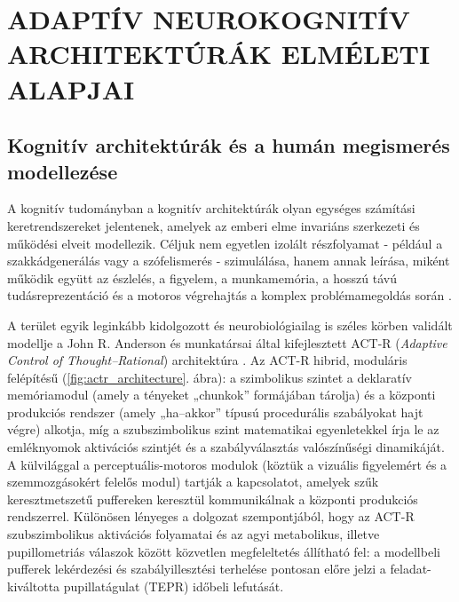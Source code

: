 \documentclass[12pt,a4paper,oneside]{book}
\begin{document}
\section{ADAPTÍV NEUROKOGNITÍV ARCHITEKTÚRÁK ELMÉLETI ALAPJAI}

\subsection{Kognitív architektúrák és a humán megismerés modellezése}

A kognitív tudományban a kognitív architektúrák olyan egységes számítási keretrendszereket jelentenek, amelyek az emberi elme invariáns szerkezeti és működési elveit modellezik. Céljuk nem egyetlen izolált részfolyamat - például a szakkádgenerálás vagy a szófelismerés - szimulálása, hanem annak leírása, miként működik együtt az észlelés, a figyelem, a munkamemória, a hosszú távú tudásreprezentáció és a motoros végrehajtás a komplex problémamegoldás során \cite{anderson2007}.

A terület egyik leginkább kidolgozott és neurobiológiailag is széles körben validált modellje a John R. Anderson és munkatársai által kifejlesztett ACT-R (\emph{Adaptive Control of Thought--Rational}) architektúra \cite{anderson2007}. Az ACT-R hibrid, moduláris felépítésű (\ref{fig:actr_architecture}. ábra): a szimbolikus szintet a deklaratív memóriamodul (amely a tényeket „chunkok” formájában tárolja) és a központi produkciós rendszer (amely „ha--akkor” típusú procedurális szabályokat hajt végre) alkotja, míg a szubszimbolikus szint matematikai egyenletekkel írja le az emléknyomok aktivációs szintjét és a szabályválasztás valószínűségi dinamikáját. A külvilággal a perceptuális-motoros modulok (köztük a vizuális figyelemért és a szemmozgásokért felelős modul) tartják a kapcsolatot, amelyek szűk keresztmetszetű puffereken keresztül kommunikálnak a központi produkciós rendszerrel. Különösen lényeges a dolgozat szempontjából, hogy az ACT-R szubszimbolikus aktivációs folyamatai és az agyi metabolikus, illetve pupillometriás válaszok között közvetlen megfeleltetés állítható fel: a modellbeli pufferek lekérdezési és szabályillesztési terhelése pontosan előre jelzi a feladat-kiváltotta pupillatágulat (TEPR) időbeli lefutását.
\end{document}
